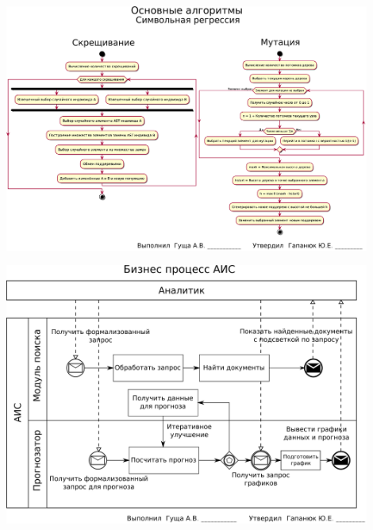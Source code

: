 \documentclass[russian,utf8, a1paper, emptystyle]{eskdgraph}
\begin{document}
\begin{ESKDdrawing}
\centering
\includegraphics[width=0.90\textwidth]{lists/list11}
\end{ESKDdrawing}

\begin{ESKDdrawing}
\centering
\includegraphics[width=0.90\textwidth]{lists/list12}
\end{ESKDdrawing}
\end{document}
